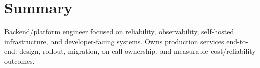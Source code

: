 \section{Summary}
\small{
Backend/platform engineer focused on reliability, observability, self-hosted infrastructure, and developer-facing systems. Owns production services end-to-end: design, rollout, migration, on-call ownership, and measurable cost/reliability outcomes.
}
\vspace{-6pt}
